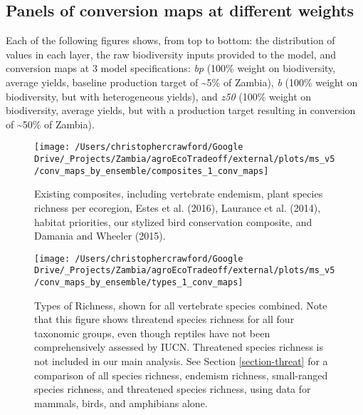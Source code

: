 \documentclass[
]{article}
\begin{document}
\newpage

\hypertarget{panels-of-conversion-maps-at-different-weights}{%
\subsection{Panels of conversion maps at different weights}\label{panels-of-conversion-maps-at-different-weights}}

Each of the following figures shows, from top to bottom: the distribution of values in each layer, the raw biodiversity inputs provided to the model, and conversion maps at 3 model specifications: \emph{bp} (100\% weight on biodiversity, average yields, baseline production target of \textasciitilde5\% of Zambia), \emph{b} (100\% weight on biodiversity, but with heterogeneous yields), and \emph{z50} (100\% weight on biodiversity, average yields, but with a production target resulting in conversion of \textasciitilde50\% of Zambia).

















\begin{figure}
\texttt{[image: /Users/christophercrawford/Google Drive/\_Projects/Zambia/agroEcoTradeoff/external/plots/ms\_v5/conv\_maps\_by\_ensemble/composites\_1\_conv\_maps]} \caption{Existing composites, including vertebrate endemism, plant species richness per ecoregion, Estes et al. (2016), Laurance et al. (2014), habitat priorities, our stylized bird conservation composite, and Damania and Wheeler (2015).}\label{fig:conv-maps-comp-1}
\end{figure}

\begin{figure}
\texttt{[image: /Users/christophercrawford/Google Drive/\_Projects/Zambia/agroEcoTradeoff/external/plots/ms\_v5/conv\_maps\_by\_ensemble/types\_1\_conv\_maps]} \caption{Types of Richness, shown for all vertebrate species combined. Note that this figure shows threatend species richness for all four taxonomic groups, even though reptiles have not been comprehensively assessed by IUCN. Threatened species richness is not included in our main analysis. See Section \ref{section-threat} for a comparison of all species richness, endemism richness, small-ranged species richness, and threatened species richness, using data for mammals, birds, and amphibians alone.}\label{fig:conv-maps-types-1}
\end{figure}
\end{document}

